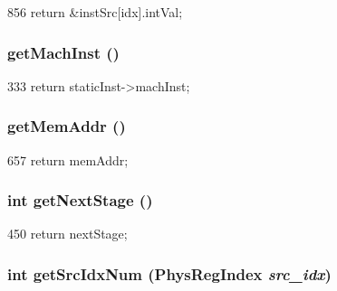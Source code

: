 \begin{DoxyCode}
856 { return &instSrc[idx].intVal; }
\end{DoxyCode}
\hypertarget{classInOrderDynInst_a90d70d753e57c018f4ce3e12e261d150}{
\subsubsection[{getMachInst}]{ getMachInst ()}}
\label{classInOrderDynInst_a90d70d753e57c018f4ce3e12e261d150}



\begin{DoxyCode}
333 { return staticInst->machInst; }
\end{DoxyCode}
\hypertarget{classInOrderDynInst_aa48b472bbabe0d9826b5f06204d1fcfe}{
\subsubsection[{getMemAddr}]{ getMemAddr ()}}
\label{classInOrderDynInst_aa48b472bbabe0d9826b5f06204d1fcfe}



\begin{DoxyCode}
657     { return memAddr; }
\end{DoxyCode}
\hypertarget{classInOrderDynInst_aa05eaedc24bd1656294edb1d9d4a0efa}{
\subsubsection[{getNextStage}]{\setlength{\rightskip}{0pt plus 5cm}int getNextStage ()}}
\label{classInOrderDynInst_aa05eaedc24bd1656294edb1d9d4a0efa}



\begin{DoxyCode}
450 { return nextStage; }
\end{DoxyCode}
\hypertarget{classInOrderDynInst_a387c4c59efe1725330826a896a18745c}{
\subsubsection[{getSrcIdxNum}]{\setlength{\rightskip}{0pt plus 5cm}int getSrcIdxNum ({\bf PhysRegIndex} {\em src\_\-idx})}}
\label{classInOrderDynInst_a387c4c59efe1725330826a896a18745c}



